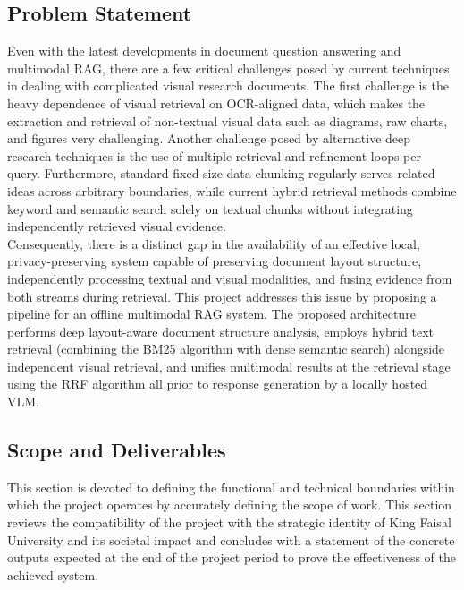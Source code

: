 \documentclass[11pt,a4paper]{report}
\begin{document}
\subsection{Problem Statement}
Even with the latest developments in document question answering and multimodal \ac{RAG}, there are a few critical challenges posed by current techniques in dealing with complicated visual research documents. The first challenge is the heavy dependence of visual retrieval on \ac{OCR}-aligned data, which makes the extraction and retrieval of non-textual visual data such as diagrams, raw charts, and figures very challenging. Another challenge posed by alternative deep research techniques is the use of multiple retrieval and refinement loops per query. Furthermore, standard fixed-size data chunking regularly serves related ideas across arbitrary boundaries, while current hybrid retrieval methods combine keyword and semantic search solely on textual chunks without integrating independently retrieved visual evidence.\\

Consequently, there is a distinct gap in the availability of an effective local, privacy-preserving system capable of preserving document layout structure, independently processing textual and visual modalities, and fusing evidence from both streams during retrieval. This project addresses this issue by proposing a pipeline for an offline multimodal \ac{RAG} system. The proposed architecture performs deep layout-aware document structure analysis, employs hybrid text retrieval (combining the \ac{BM25} algorithm with dense semantic search) alongside independent visual retrieval, and unifies multimodal results at the retrieval stage using the \ac{RRF} algorithm all prior to response generation by a locally hosted \ac{VLM}.

\subsection{Scope and Deliverables}
This section is devoted to defining the functional and technical boundaries within which the project operates by accurately defining the scope of work. This section reviews the compatibility of the project with the strategic identity of King Faisal University and its societal impact and concludes with a statement of the concrete outputs expected at the end of the project period to prove the effectiveness of the achieved system.
\end{document}
